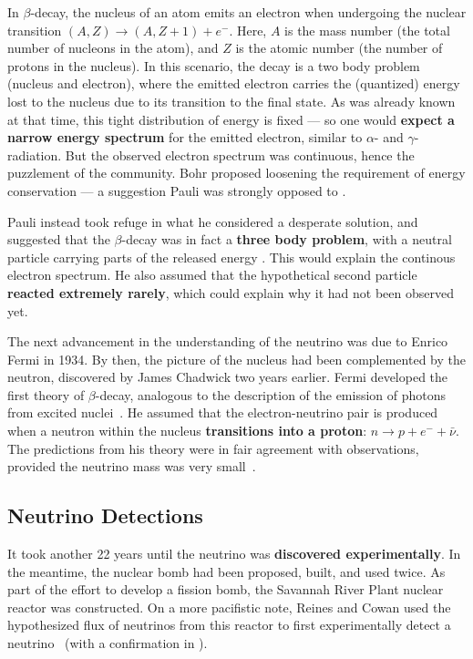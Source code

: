 In $\beta$-decay, the nucleus of an atom emits an electron when undergoing the nuclear transition $(A,Z)\rightarrow(A,Z+1) + e^-$. Here, $A$ is the mass number (the total number of nucleons in the atom), and $Z$ is the atomic number (the number of protons in the nucleus). In this scenario, the decay is a two body problem (nucleus and electron), where the emitted electron carries the (quantized) energy lost to the nucleus due to its transition to the final state. As was already known at that time, this tight distribution of energy is fixed --- so one would \textbf{expect a narrow energy spectrum} for the emitted electron, similar to $\alpha$- and $\gamma$-radiation. But the observed electron spectrum was continuous, hence the puzzlement of the community. Bohr proposed loosening the requirement of energy conservation --- a suggestion Pauli was strongly opposed to .

Pauli instead took refuge in what he considered a desperate solution, and suggested that the $\beta$-decay was in fact a \textbf{three body problem}, with a neutral particle carrying parts of the released energy . This would explain the continous electron spectrum. He also assumed that the hypothetical second particle \textbf{reacted extremely rarely}, which could explain why it had not been observed yet.

The next advancement in the understanding of the neutrino was due to Enrico Fermi in 1934. By then, the picture of the nucleus had been complemented by the neutron, discovered by James Chadwick two years earlier. Fermi developed the first theory of $\beta$-decay, analogous to the description of the emission of photons from excited nuclei~\cite{Fermi1934}. He assumed that the electron-neutrino pair is produced when a neutron within the nucleus \textbf{transitions into a proton}: $n \rightarrow p + e^- + \bar{\nu}$. The predictions from his theory were in fair agreement with observations, provided the neutrino mass was very small~\cite{Fermi1934}.

\subsection{Neutrino Detections}
It took another 22 years until the neutrino was \textbf{discovered experimentally}. In the meantime, the nuclear bomb had been proposed, built, and used twice. As part of the effort to develop a fission bomb, the Savannah River Plant nuclear reactor was constructed. On a more pacifistic note, Reines and Cowan used the hypothesized flux of neutrinos from this reactor to first experimentally detect a neutrino~\cite{Reines1956} (with a confirmation in ).

